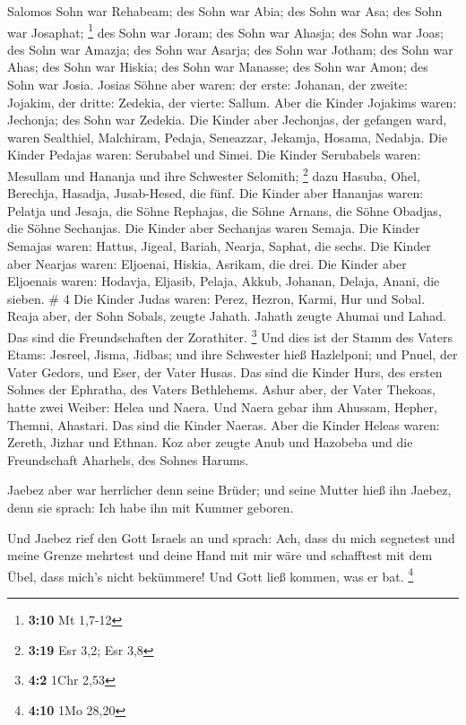  Salomos Sohn war Rehabeam; des Sohn war Abia; des Sohn war
Asa; des Sohn war Josaphat; \footnote{\textbf{3:10} Mt 1,7-12}
 des Sohn war Joram; des Sohn war Ahasja; des Sohn war
Joas;  des Sohn war Amazja; des Sohn war Asarja; des Sohn
war Jotham;  des Sohn war Ahas; des Sohn war Hiskia; des
Sohn war Manasse;  des Sohn war Amon; des Sohn war Josia.
 Josias Söhne aber waren: der erste: Johanan, der zweite:
Jojakim, der dritte: Zedekia, der vierte: Sallum.  Aber die
Kinder Jojakims waren: Jechonja; des Sohn war Zedekia.  Die
Kinder aber Jechonjas, der gefangen ward, waren Sealthiel, 
Malchiram, Pedaja, Seneazzar, Jekamja, Hosama, Nedabja. 
Die Kinder Pedajas waren: Serubabel und Simei. Die Kinder Serubabels
waren: Mesullam und Hananja und ihre Schwester Selomith; \footnote{\textbf{3:19}
  Esr 3,2; Esr 3,8}  dazu Hasuba, Ohel, Berechja, Hasadja,
Jusab-Hesed, die fünf.  Die Kinder aber Hananjas waren:
Pelatja und Jesaja, die Söhne Rephajas, die Söhne Arnans, die Söhne
Obadjas, die Söhne Sechanjas.  Die Kinder aber Sechanjas
waren Semaja. Die Kinder Semajas waren: Hattus, Jigeal, Bariah, Nearja,
Saphat, die sechs.  Die Kinder aber Nearjas waren:
Eljoenai, Hiskia, Asrikam, die drei.  Die Kinder aber
Eljoenais waren: Hodavja, Eljasib, Pelaja, Akkub, Johanan, Delaja,
Anani, die sieben. \# 4  Die Kinder Judas waren: Perez,
Hezron, Karmi, Hur und Sobal.  Reaja aber, der Sohn Sobals,
zeugte Jahath. Jahath zeugte Ahumai und Lahad. Das sind die
Freundschaften der Zorathiter. \footnote{\textbf{4:2} 1Chr 2,53}
 Und dies ist der Stamm des Vaters Etams: Jesreel, Jisma,
Jidbas; und ihre Schwester hieß Hazlelponi;  und Pnuel, der
Vater Gedors, und Eser, der Vater Husas. Das sind die Kinder Hurs, des
ersten Sohnes der Ephratha, des Vaters Bethlehems.  Ashur
aber, der Vater Thekoas, hatte zwei Weiber: Helea und Naera.
 Und Naera gebar ihm Ahussam, Hepher, Themni, Ahastari. Das
sind die Kinder Naeras.  Aber die Kinder Heleas waren:
Zereth, Jizhar und Ethnan.  Koz aber zeugte Anub und
Hazobeba und die Freundschaft Aharhels, des Sohnes Harums.

 Jaebez aber war herrlicher denn seine Brüder; und seine
Mutter hieß ihn Jaebez, denn sie sprach: Ich habe ihn mit Kummer
geboren.

 Und Jaebez rief den Gott Israels an und sprach: Ach, dass
du mich segnetest und meine Grenze mehrtest und deine Hand mit mir wäre
und schafftest mit dem Übel, dass mich's nicht bekümmere! Und Gott ließ
kommen, was er bat. \footnote{\textbf{4:10} 1Mo 28,20}

